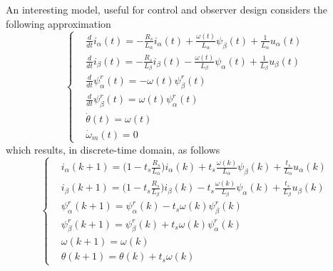 \documentclass[12pt,a4paper,oneside]{book}
\begin{document}
\begin{onehalfspace}
\begin{mybox}
	An interesting model, useful for control and observer design considers the following approximation
		\begin{equation}\label{reduced}
		\left\lbrace \begin{aligned}
			& \frac{d}{dt} i_\alpha(t)= -\frac{R_s}{L_\alpha}i_\alpha(t) 
			+\frac{\omega(t)}{L_\alpha}\psi_\beta(t)+\frac{1}{L_\alpha}u_\alpha(t)
			\\[6pt]
			& \frac{d}{dt} i_\beta(t)= -\frac{R_s}{L_\beta}i_\beta(t) 
			-\frac{\omega(t)}{L_\beta}\psi_\alpha(t)+\frac{1}{L_\beta}u_\beta(t)
			\\[6pt]
			&\frac{d}{dt} \psi_\alpha^r(t) = -\omega(t)\psi_\beta^r(t) \\[6pt]
			&\frac{d}{dt} \psi_\beta^r(t) = \omega(t)\psi_\alpha^r(t) \\[6pt]
			& \dot{\theta}(t) = \omega(t) \\[6pt]
			& \dot{\omega}_m(t) = 0 
		\end{aligned} \right. 
	\end{equation}
	which results, in discrete-time domain, as follows
	\begin{equation}\label{twophase_model_ref_ab_dt_splitted}
		\left\lbrace \begin{aligned}
			& i_\alpha(k+1)=\Big(1-t_s\frac{R_s}{L_\alpha}\Big) i_\alpha(k) 
			+t_s\frac{\omega(k)}{L_\alpha}\psi_\beta(k)+\frac{t_s}{L_\alpha}u_\alpha(k)
			 \\[6pt]
			& i_\beta(k+1) = \Big(1-t_s\frac{R_s}{L_\beta}\Big)i_\beta(k) 
			-t_s\frac{\omega(k)}{L_\beta}\psi_\alpha(k)+\frac{t_s}{L_\beta}u_\beta(k)
			 \\[6pt]
			&\psi_\alpha^r(k+1) = \psi_\alpha^r(k) -t_s\omega(k)\psi_\beta^r(k) 
			\\[6pt]
			&\psi_\beta^r(k+1) = \psi_\beta^r(k) + t_s\omega(k)\psi_\alpha^r(k) 
			\\[6pt]
			& \omega(k+1) = \omega(k) \\[6pt]
			& \theta(k+1) = \theta(k) + t_s\omega(k)
		\end{aligned} \right. 
	\end{equation}
\end{mybox}


\end{onehalfspace}
\end{document}
